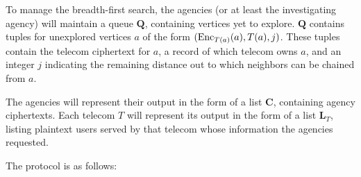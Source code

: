 To manage the breadth-first search, the agencies (or at least the investigating agency) will maintain a queue $\mathbf{Q}$, containing vertices yet to explore. $\mathbf{Q}$ contains tuples for unexplored vertices $a$ of the form $(\operatorname{Enc}_{T(a)}(a), T(a), j)$. These tuples contain the telecom ciphertext for $a$, a record of which telecom owns $a$, and an integer $j$ indicating the remaining distance out to which neighbors can be chained from $a$.



The agencies will represent their output in the form of a list $\mathbf{C}$, containing agency ciphertexts. Each telecom $T$ will represent its output in the form of a list $\mathbf{L}_T$, listing plaintext users served by that telecom whose information the agencies requested.



The protocol is as follows:



